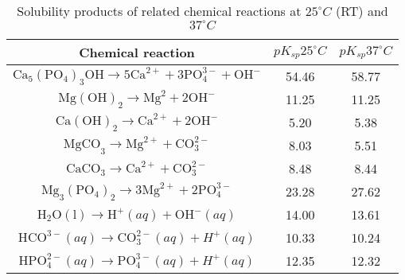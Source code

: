 \begin{table}[h]
\caption[Solubility products of related chemical reactions]{Solubility products of related chemical reactions at $25^{\circ}C$ ({RT}) and $37^{\circ}C$ \cite{Wang2022}}
\medskip
\centering
\begin{tabular}{ccc}
\hline
Chemical reaction & $pK_{sp} 25^{\circ}C$ & $pK_{sp} 37^{\circ}C$ \\ \hline
$\mathrm{Ca}_{5}\left(\mathrm{PO}_{4}\right)_{3} \mathrm{OH}  \rightarrow 5 \mathrm{Ca}^{2+}+3 \mathrm{PO}_{4}^{3-}+\mathrm{OH}^{-}$ & 54.46 & 58.77 \\
$\mathrm{Mg}(\mathrm{OH})_{2}  \rightarrow \mathrm{Mg}^{2}+2 \mathrm{OH}^{-}$ & 11.25 & 11.25 \\
$\mathrm{Ca}(\mathrm{OH})_{2} \rightarrow \mathrm{Ca}^{2+}+2 \mathrm{OH}^{-}$ & 5.20 & 5.38 \\
$\mathrm{MgCO}_{3} \rightarrow \mathrm{Mg}^{2+}+\mathrm{CO}_{3}^{2-}$ & 8.03 & 5.51 \\
$\mathrm{CaCO}_{3}  \rightarrow \mathrm{Ca}^{2+}+\mathrm{CO}_{3}^{2-}$ & 8.48 & 8.44 \\
$\mathrm{Mg}_{3}\left(\mathrm{PO}_{4}\right)_{2}  \rightarrow 3 \mathrm{Mg}^{2+}+2 \mathrm{PO}_{4}^{3-}$ & 23.28 & 27.62 \\
$\mathrm{H}_{2} \mathrm{O}(\mathrm{l})  \rightarrow \mathrm{H}^{+}(aq)+\mathrm{OH}^{-}(a q)$ & 14.00 & 13.61 \\
$\mathrm{HCO}^{3-}(aq) \rightarrow \mathrm{CO}_{3}^{2-}(aq)+H^{+}(aq)$ & 10.33 & 10.24 \\
$\mathrm{HPO}_{4}^{2-}(aq) \rightarrow \mathrm{PO}_{4}^{3-}(a q)+H^{+}(aq)$ & 12.35 & 12.32 \\
\hline
\end{tabular}
\label{tab:kinetics_reactions}
\end{table}

